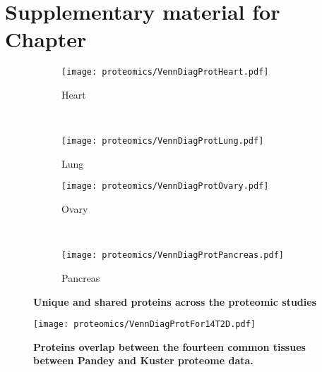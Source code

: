 \chapter{Suppl\texorpdfstring{ementary}{.} material for Chap\texorpdfstring{ter}{.}
}\label{ch:app-Proteomics}

\begin{figure}[!htbp]
    \centering
    \begin{subfigure}[b]{.5\textwidth}
        \centering \texttt{[image: proteomics/VennDiagProtHeart.pdf]}
        \caption{Heart}\label{fig:prot3Dheart}
    \end{subfigure}~%
    \begin{subfigure}[b]{.5\textwidth}
        \centering \texttt{[image: proteomics/VennDiagProtLung.pdf]}
        \caption{Lung}\label{fig:prot3Dlung}
    \end{subfigure}

    \begin{subfigure}[b]{.5\textwidth}
        \centering \texttt{[image: proteomics/VennDiagProtOvary.pdf]}
        \caption{Ovary}\label{fig:prot3Dovary}
    \end{subfigure}~%
    \begin{subfigure}[b]{.5\textwidth}
        \centering \texttt{[image: proteomics/VennDiagProtPancreas.pdf]}
        \caption{Pancreas}\label{fig:prot3Dpancreas}
    \end{subfigure}
    \caption[Unique and shared proteins across the proteomic studies]%
    {\label{fig:protbkdownT}\textbf{Unique and shared proteins
    across the proteomic studies}}
\end{figure}


\begin{figure}[!htbp]
    \texttt{[image: proteomics/VennDiagProtFor14T2D.pdf]}\centering
    \caption[Proteins overlap between the common tissues of Pandey and Kuster
    data]{\label{fig:VennDiagProt2D}\textbf{Proteins overlap between the fourteen
    common tissues between Pandey and Kuster proteome data.}}
\end{figure}

